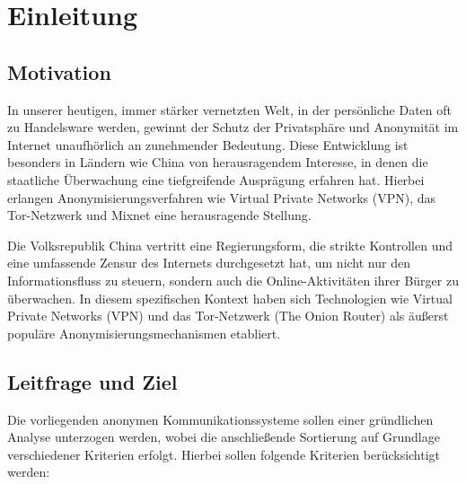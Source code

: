 \section{Einleitung}

\subsection{Motivation}

In unserer heutigen, immer stärker vernetzten Welt, in der persönliche Daten oft zu Handelsware werden, gewinnt der Schutz der Privatsphäre und Anonymität im Internet unaufhörlich an zunehmender Bedeutung. Diese Entwicklung ist besonders in Ländern wie China von herausragendem Interesse, in denen die staatliche Überwachung eine tiefgreifende Ausprägung erfahren hat. Hierbei erlangen Anonymisierungsverfahren wie Virtual Private Networks (VPN), das Tor-Netzwerk und Mixnet eine herausragende Stellung.

Die Volksrepublik China vertritt eine Regierungsform, die strikte Kontrollen und eine umfassende Zensur des Internets durchgesetzt hat, um nicht nur den Informationsfluss zu steuern, sondern auch die Online-Aktivitäten ihrer Bürger zu überwachen. In diesem spezifischen Kontext haben sich Technologien wie Virtual Private Networks (VPN) und das Tor-Netzwerk (The Onion Router) als äußerst populäre Anonymisierungsmechanismen etabliert.

\subsection{Leitfrage und Ziel}

Die vorliegenden anonymen Kommunikationssysteme sollen einer gründlichen Analyse unterzogen werden, wobei die anschließende Sortierung auf Grundlage verschiedener Kriterien erfolgt. Hierbei sollen folgende Kriterien berücksichtigt werden:

